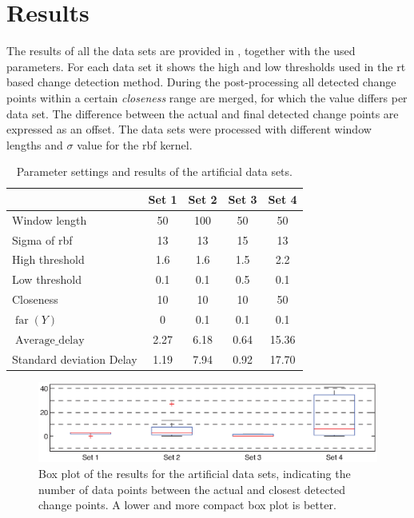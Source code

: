 \section{Results}\label{sec:artificial_data_results}
The results of all the data sets are provided in , together with the used parameters.
For each data set it shows the high and low thresholds used in the \gls{rt} based change detection method.
During the post-processing all detected change points within a certain \emph{closeness} range are merged, for which the value differs per data set.
The difference between the actual and final detected change points are expressed as an offset.
The data sets were processed with different window lengths and $\sigma$ value for the \gls{rbf} kernel.

\begin{table}
  \centering
  \begin{tabulary}{\textwidth}{|l|c|c|c|c|}
     & Set 1 & Set 2 & Set 3 & Set 4 \\
    \hline
    Window length & 50 & 100 & 50 & 50 \\
    \hline
    Sigma of \gls{rbf} & 13 & 13 & 15 & 13 \\
    \hline
    High threshold & 1.6 & 1.6 & 1.5 & 2.2 \\
    \hline
    Low threshold & 0.1 & 0.1 & 0.5 & 0.1 \\
    \hline
    Closeness & 10 & 10 & 10 & 50 \\
    \hline
    \hline
    $\operatorname*{far}(Y)$ & 0 & 0.1 & 0.1 & 0.1 \\
    \hline
    $\operatorname*{Average\_delay}$ & 2.27 & 6.18 & 0.64 & 15.36 \\
    \hline
    Standard deviation Delay & 1.19 & 7.94 & 0.92 & 17.70 \\
    \hline
  \end{tabulary}
  \caption[Results artificial data sets]{Parameter settings and results of the artificial data sets.}
  \label{tab:results_artificial}
\end{table}

\begin{figure}
\centering
  \includegraphics[width=1\textwidth]{./Figures/chapter5/boxplot_results_artificial_sets.eps}
  \caption[Box plot results artificial data sets]{Box plot of the results for the artificial data sets, indicating the number of data points between the actual and closest detected change points. A lower and more compact box plot is better.}
  \label{fig:boxplot_artificial_sets}
\end{figure}

